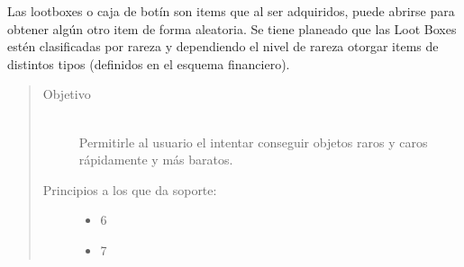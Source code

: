     Las lootboxes o caja de botín son items que al ser adquiridos, puede abrirse para obtener algún otro item de forma aleatoria. Se tiene planeado que las Loot Boxes estén clasificadas por rareza y dependiendo el nivel de rareza otorgar items de distintos tipos (definidos en el esquema financiero).


    \begin{quote}
    \begin{description}
    \item[Objetivo] \hfill\\
        Permitirle al usuario el intentar conseguir objetos raros y caros rápidamente y más baratos.

    \item[Principios a los que da soporte:] \hfill
        \begin{itemize}
            \item 6 \principioVI
            \item 7 \principioVII
        \end{itemize}
    \end{description}
    \end{quote}
